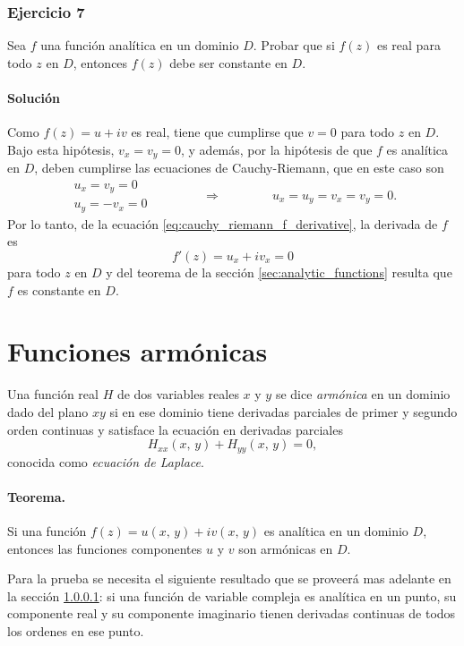 \documentclass[a4paper]{report}
\begin{document}
\subsubsection{Ejercicio 7}

Sea \(f\) una función analítica en un dominio \(D\). Probar que si \(f(z)\) es real para todo \(z\) en \(D\), entonces \(f(z)\) debe ser constante en \(D\).

\paragraph{Solución} Como \(f(z)=u+iv\) es real, tiene que cumplirse que \(v=0\) para todo \(z\) en \(D\). Bajo esta hipótesis, \(v_x=v_y=0\), y además, por la hipótesis de que \(f\) es analítica en \(D\), deben cumplirse las ecuaciones de Cauchy-Riemann, que en este caso son
\[
 \begin{array}{l}
  u_x=v_y=0\\
  u_y=-v_x=0
 \end{array}
 \qquad\qquad\Rightarrow\qquad\qquad
 u_x=u_y=v_x=v_y=0.
\]
Por lo tanto, de la ecuación \ref{eq:cauchy_riemann_f_derivative}, la derivada de \(f\) es
\[
 f'(z)=u_x+iv_x=0
\]
para todo \(z\) en \(D\) y del teorema de la sección \ref{sec:analytic_functions} resulta que \(f\) es constante en \(D\).

\section{Funciones armónicas}\label{sec:harmonic_functions}

Una función real \(H\) de dos variables reales \(x\) y \(y\) se dice \emph{armónica} en un dominio dado del plano \(xy\) si en ese dominio tiene derivadas parciales de primer y segundo orden continuas y satisface la ecuación en derivadas parciales
\begin{equation}\label{eq:laplace_equation}
 H_{xx}(x,\,y)+H_{yy}(x,\,y)=0, 
\end{equation}
conocida como \emph{ecuación de Laplace}.

\paragraph{Teorema.} Si una función \(f(z)=u(x,\,y)+iv(x,\,y)\) es analítica en un dominio \(D\), entonces las funciones componentes \(u\) y \(v\) son armónicas en \(D\). 

Para la prueba se necesita el siguiente resultado que se proveerá mas adelante en la sección \ref{}: si una función de variable compleja es analítica en un punto, su componente real y su componente imaginario tienen derivadas continuas de todos los ordenes en ese punto. 
\end{document}
